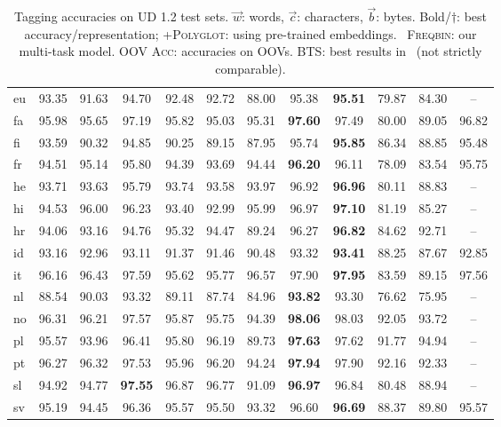 \documentclass[11pt]{article}
\begin{document}
\begin{table}[h!t]
{\begin{tabular}{lcc|cccc|cc|cc|c}
eu	& 93.35 & 91.63 &  94.70 & 92.48 & 92.72 & 88.00 & 95.38 & \textbf{95.51}& 79.87 & 84.30 & --\\
fa	& 95.98 & 95.65 &  97.19 & 95.82	 & 95.03 & 95.31 & \textbf{97.60} & 97.49& 80.00& 89.05  & 96.82\\
fi	& 93.59 & 90.32 &  94.85 & 90.25	 & 89.15 & 87.95 & 95.74 & \textbf{95.85}& 86.34 & 88.85 & 95.48\\
fr	& 94.51 & 95.14 &  95.80 & 94.39	 & 93.69 & 94.44 & \textbf{96.20} & 96.11& 78.09 &  83.54 & 95.75\\
he	& 93.71 & 93.63 &  95.79 & 93.74	 & 93.58 & 93.97 & 96.92 & \textbf{96.96}& 80.11 & 88.83 & --\\
hi	& 94.53 & 96.00 &  96.23 & 93.40 & 92.99 & 95.99 & 96.97 & \textbf{97.10}& 81.19& 85.27 & --\\
hr	& 94.06 & 93.16 &  94.76 &95.32 & 94.47 & 89.24 & 96.27 & \textbf{96.82}& 84.62& 92.71 & --\\
id	& 93.16 & 92.96 &  93.11 & 91.37 & 91.46 & 90.48 & 93.32 & \textbf{93.41}& 88.25 & 87.67 & 92.85\\
it	& 96.16 & 96.43 &  97.59 & 95.62 & 95.77 & 96.57 & 97.90 & \textbf{97.95}& 83.59 & 89.15 & 97.56\\
nl	& 88.54 & 90.03 &  93.32 & 89.11 & 87.74 & 84.96 & \textbf{93.82} & 93.30& 76.62 & 75.95 & --\\
no	& 96.31 & 96.21 &  97.57 & 95.87	 & 95.75 & 94.39 & \textbf{98.06} & 98.03& 92.05 & 93.72  & --\\
pl	& 95.57 & 93.96 &  96.41 & 95.80 & 96.19 & 89.73 & \textbf{97.63} & 97.62& 91.77 & 94.94 & --\\
pt	& 96.27 & 96.32 &  97.53 & 95.96	& 96.20 & 94.24 & \textbf{97.94} & 97.90& 92.16 & 92.33 & --\\
sl	& 94.92 & 94.77 &  \textbf{97.55} & 96.87	 & 96.77 & 91.09 & \textbf{96.97} & 96.84& 80.48& 88.94 & --\\
sv	& 95.19 & 94.45 &  96.36 & 95.57 & 95.50 &93.32 & 96.60 & \textbf{96.69}& 88.37 & 89.80 & 95.57\\
\bottomrule

\end{tabular}
}
\caption{Tagging accuracies on UD 1.2 test sets. $\vec{w}$: words, $\vec{c}$: characters, $\vec{b}$: bytes. 
Bold/$\dagger$: best accuracy/representation; \textsc{+Polyglot}: using pre-trained embeddings. \
\textsc{Freqbin}: our multi-task model. \textsc{OOV Acc}: accuracies on OOVs. 
BTS: best results in~\newcite{gillick:ea:2016} (not strictly comparable). }
\label{tbl:results}
\end{table}
\end{document}
